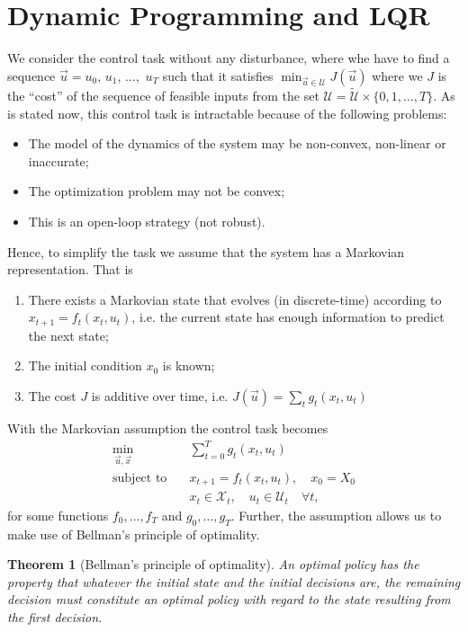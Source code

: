 \documentclass[margin=small]{hsrzf}
\newtheorem{thm}{Theorem}
\begin{document}
\section{Dynamic Programming and LQR}

We consider the control task without any disturbance, where whe have to find a
sequence $\vec{u} = u_0$, $u_1$, $\ldots,$ $u_T$ such that it satisfies
$\min_{\vec{u} \in \mathcal{U}} J(\vec{u})$ where we $J$ is the ``cost'' of
the sequence of feasible inputs from the set $\mathcal{U} =
\tilde{\mathcal{U}} \times \{0,1,\ldots,T\}$. As is stated now, this control
task is intractable because of the following problems:
\begin{itemize}
  \item The model of the dynamics of the system may be non-convex, non-linear
    or inaccurate;
  \item The optimization problem may not be convex;
  \item This is an open-loop strategy (not robust).
\end{itemize}
Hence, to simplify the task we assume that the system has a Markovian
representation. That is
\begin{enumerate}
  \item There exists a Markovian state that evolves (in discrete-time) according to
    $x_{t+1} = f_t(x_t, u_t)$, i.e. the current state has enough information
    to predict the next state;
  \item The initial condition $x_0$ is known;
  \item The cost $J$ is additive over time, i.e.
    $J(\vec{u}) = \sum_t g_t(x_t, u_t)$
\end{enumerate}
With the Markovian assumption the control task becomes
\begin{align*}
  \min_{\vec{u}, \vec{x}} &\quad \sum_{t=0}^T g_t(x_t, u_t) \\
  \text{subject to} &\quad x_{t+1} = f_t(x_t, u_t), \quad x_0 = X_0 \\
  &\quad x_t \in \mathcal{X}_t,\quad u_t \in \mathcal{U}_t \quad \forall t,
\end{align*}
for some functions $f_0, \ldots, f_T$ and $g_0, \ldots, g_T$. Further, the
assumption allows us to make use of Bellman's principle of optimality.

\begin{thm}[Bellman's principle of optimality]
  An optimal policy has the property that whatever the initial state and the
  initial decisions are, the remaining decision must constitute an optimal
  policy with regard to the state resulting from the first decision.
\end{thm}
\end{document}
